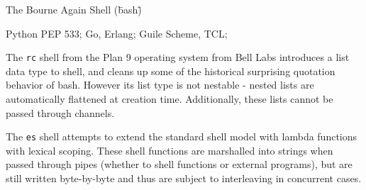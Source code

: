 \documentclass[format=sigconf, review=true, draft=true, screen=true]{acmart}
\begin{document}
The Bourne Again Shell (\"bash\")

Python PEP 533; Go, Erlang; Guile Scheme, TCL;

The \verb/rc/ shell \cite{duff} from the Plan 9 operating system from Bell Labs introduces a list data type to shell, and cleans up some of the historical surprising quotation behavior of bash. However its list type is not nestable - nested lists are automatically flattened at creation time. Additionally, these lists cannot be passed through channels.

The \verb/es/ shell \cite{haahr} attempts to extend the standard shell model with lambda functions with lexical scoping. These shell functions are marshalled into strings when passed through pipes (whether to shell functions or external programs), but are still written byte-by-byte and thus are subject to interleaving in concurrent cases.




\end{document}
